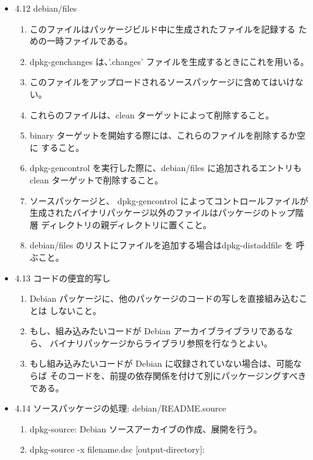\documentclass[mingoth,a4paper]{jsarticle}
\begin{document}
\begin{itemize}
\item 4.12 debian/files
  \begin{enumerate}
  \item このファイルはパッケージビルド中に生成されたファイルを記録する
    ための一時ファイルである。
  \item dpkg-genchanges は、'.changes' ファイルを生成するときにこれを用いる。
  \item このファイルをアップロードされるソースパッケージに含めてはいけない。
  \item これらのファイルは、clean ターゲットによって削除すること。
  \item binary ターゲットを開始する際には、これらのファイルを削除するか空に
    すること。
  \item dpkg-gencontrol を実行した際に、debian/files に追加されるエントリも
    clean ターゲットで削除すること。
  \item ソースパッケージと、 dpkg-gencontrol によってコントロールファイルが
    生成されたバイナリパッケージ以外のファイルはパッケージのトップ階層
    ディレクトリの親ディレクトリに置くこと。
  \item debian/files のリストにファイルを追加する場合はdpkg-distaddfile を
    呼ぶこと。
  \end{enumerate}

\item 4.13 コードの便宜的写し
  \begin{enumerate}
  \item Debian パッケージに、他のパッケージのコードの写しを直接組み込むことは
    しないこと。
  \item もし、組み込みたいコードが Debian アーカイブライブラリであるなら、
    バイナリパッケージからライブラリ参照を行なうとよい。
  \item もし組み込みたいコードが Debian に収録されていない場合は、可能ならば
    そのコードを、前提の依存関係を付けて別にパッケージングすべきである。
  \end{enumerate}

\item 4.14 ソースパッケージの処理: debian/README.source
  \begin{enumerate}
  \item dpkg-source: Debian ソースアーカイブの作成、展開を行う。
  \item dpkg-source -x filename.dsc [output-directory]:


\end{enumerate}
\end{itemize}
\end{document}
